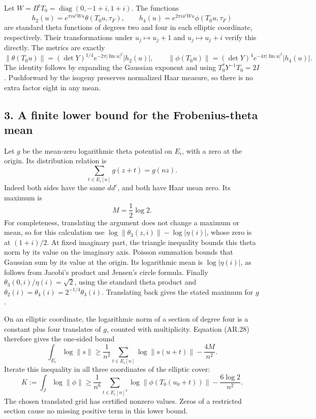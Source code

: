 Let \(W=B^tT_0=\operatorname{diag}(0,-1+i,1+i)\). The functions \[
h_2(u)=e^{\pi i u^tWu}\theta(T_0u,\tau_F),\qquad
h_4(u)=e^{2\pi i u^tWu}\phi(T_0u,\tau_F)
\] are standard theta functions of degrees two and four in each elliptic
coordinate, respectively. Their transformations under
\(u_j\mapsto u_j+1\) and \(u_j\mapsto u_j+i\) verify this directly. The
metrics are exactly \[
\|\theta(T_0u)\|=(\det Y)^{1/4}
 e^{-2\pi|\operatorname{Im}u|^2}|h_2(u)|,\qquad
\|\phi(T_0u)\|=(\det Y)^4
 e^{-4\pi|\operatorname{Im}u|^2}|h_4(u)|.
\tag{AR.27}
\] The identity follows by expanding the Gaussian exponent and using
\(T_0^*Y^{-1}T_0=2I\). Pushforward by the isogeny preserves normalized
Haar measure, so there is no extra factor eight in any mean.

\subsection{3. A finite lower bound for the Frobenius-theta
mean}\label{a-finite-lower-bound-for-the-frobenius-theta-mean}

Let \(g\) be the mean-zero logarithmic theta potential on \(E_i\), with
a zero at the origin. Its distribution relation is \[
\sum_{t\in E_i[n]}g(z+t)=g(nz).
\tag{AR.28}
\] Indeed both sides have the same \(dd^c\), and both have Haar mean
zero. Its maximum is \[
M=\frac12\log2.
\] For completeness, translating the argument does not change a maximum
or mean, so for this calculation use
\(\log\|\theta_3(z,i)\|-\log|\eta(i)|\), whose zero is at \((1+i)/2\).
At fixed imaginary part, the triangle inequality bounds this theta norm
by its value on the imaginary axis. Poisson summation bounds that
Gaussian sum by its value at the origin. Its logarithmic mean is
\(\log|\eta(i)|\), as follows from Jacobi's product and Jensen's circle
formula. Finally \(\theta_3(0,i)/\eta(i)=\sqrt2\), using the standard
theta product and \(\theta_2(i)=\theta_4(i)=2^{-1/4}\theta_3(i)\).
Translating back gives the stated maximum for \(g\).

On an elliptic coordinate, the logarithmic norm of a section of degree
four is a constant plus four translates of \(g\), counted with
multiplicity. Equation (AR.28) therefore gives the one-sided bound \[
\int_{E_i}\log\|s\|
\ge\frac1{n^2}\sum_{t\in E_i[n]}\log\|s(u+t)\|
       -\frac{4M}{n^2}.
\] Iterate this inequality in all three coordinates of the elliptic
cover: \[
K:=\int_J\log\|\phi\|
\ge\frac1{n^6}\sum_{t\in E_i[n]^3}
           \log\|\phi(T_0(u_0+t))\|
       -\frac{6\log2}{n^2}.
\tag{AR.29}
\] The chosen translated grid has certified nonzero values. Zeros of a
restricted section cause no missing positive term in this lower bound.

